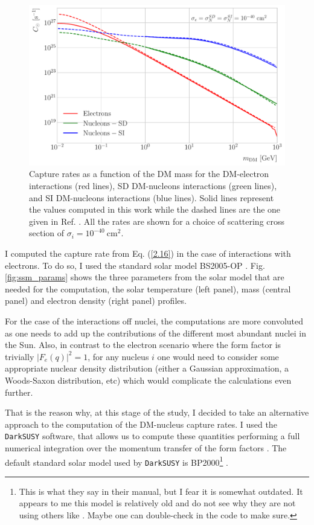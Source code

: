 \begin{figure}[t]
	\centering
	\includegraphics[width=0.9\linewidth]{Images/DM_Analysis/capture_rates.pdf}
	\caption[Capture rates as a function of the DM mass for the DM-electron interactions, SD DM-nucleons interactions, and SI DM-nucleons interactions.]{Capture rates as a function of the DM mass for the DM-electron interactions (red lines), SD DM-nucleons interactions (green lines), and SI DM-nucleons interactions (blue lines). Solid lines represent the values computed in this work while the dashed lines are the one given in Ref. \cite{Palomares2017}. All the rates are shown for a choice of scattering cross section of $\sigma_{i} = 10^{-40} \ \mathrm{cm}^{2}$.}
	\label{fig:capture_rates}
\end{figure}

I computed the capture rate from Eq. (\ref{2.16}) in the case of interactions with electrons. To do so, I used the standard solar model BS2005-OP \cite{Bahcall2004}. Fig. \ref{fig:ssm_params} shows the three parameters from the solar model that are needed for the computation, the solar temperature (left panel), mass (central panel) and electron density (right panel) profiles.

For the case of the interactions off nuclei, the computations are more convoluted as one needs to add up the contributions of the different most abundant nuclei in the Sun. Also, in contrast to the electron scenario where the form factor is trivially $|F_{e}(q)|^{2} = 1$, for any nucleus $i$ one would need to consider some appropriate nuclear density distribution (either a Gaussian approximation, a Woods-Saxon distribution, etc) which would complicate the calculations even further.

That is the reason why, at this stage of the study, I decided to take an alternative approach to the computation of the DM-nucleus capture rates. I used the \texttt{DarkSUSY} software, that allows us to compute these quantities performing a full numerical integration over the momentum transfer of the form factors \cite{Bringmann2018}. The default standard solar model used by \texttt{DarkSUSY} is BP2000\footnote{This is what they say in their manual, but I fear it is somewhat outdated. It appears to me this model is relatively old and do not see why they are not using others like \cite{Bahcall2004}. Maybe one can double-check in the code to make sure.} \cite{Bahcall2000}.

